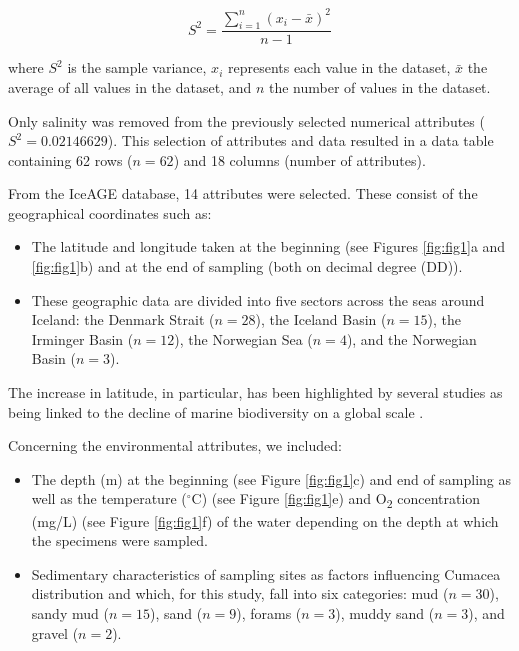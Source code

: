 \begin{equation}\label{variance}
    S^2 = \frac{\sum_{i=1}^{n} (x_i - \bar{x})^2}{n-1}
\end{equation}

where $S^2$ is the sample variance, $x_i$ represents each value in the dataset, $\bar{x}$ the average of all values in the dataset, and $n$ the number of values in the dataset.

Only salinity was removed from the previously selected numerical attributes ($S^2 = 0.02146629$). This selection of attributes and data resulted in a data table containing 62 rows ($n=62$) and 18 columns (number of attributes). 

From the IceAGE database, 14 attributes were selected. These consist of the geographical coordinates such as: 

\begin{itemize}
\item The latitude and longitude taken at the beginning (see Figures \ref{fig:fig1}a and \ref{fig:fig1}b) and at the end of sampling (both on decimal degree (DD)).
\item These geographic data are divided into five sectors across the seas around Iceland: the Denmark Strait ($n=28$), the Iceland Basin ($n=15$), the Irminger Basin ($n=12$), the Norwegian Sea ($n=4$), and the Norwegian Basin ($n=3$). 
\end{itemize}

The increase in latitude, in particular, has been highlighted by several studies as being linked to the decline of marine biodiversity on a global scale \citep{lambshead_latitudinal_2000, gage_diversity_2004}. 

Concerning the environmental attributes, we included:
\begin{itemize}
\item The depth (m) at the beginning (see Figure \ref{fig:fig1}c) and end of sampling as well as the temperature ($^\circ$C) (see Figure \ref{fig:fig1}e) and O\textsubscript{2} concentration (mg/L) (see Figure \ref{fig:fig1}f) of the water depending on the depth at which the specimens were sampled. 
\item Sedimentary characteristics of sampling sites as factors influencing Cumacea distribution \citep{uhlir_adding_2021} and which, for this study, fall into six categories: mud ($n=30$), sandy mud ($n=15$), sand ($n=9$), forams ($n=3$), muddy sand ($n=3$), and gravel ($n=2$).
\end{itemize}

